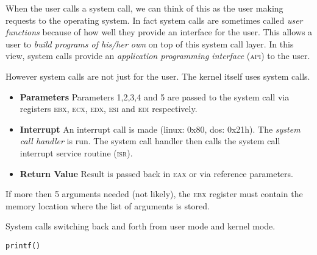
When the user calls a system call, we can think of this as the user making 
requests to the operating system. In fact system calls are sometimes called
\textit{user functions} because of how well they provide an interface for the user. 
This allows a user to \textit{build programs of his/her own} on top of this system call layer. 
In this view, system calls provide an \textit{application programming interface} 
(\textsc{api}) 
to the user.


However system calls are not just for the user. The kernel itself 
uses system calls. 

\frmrule



\begin{itemize}   
\renewcommand{\labelitemi}{$\Box$}
\item \textbf{Parameters} Parameters 1,2,3,4 and 5 are passed to the system call 
via registers \textsc{ebx}, \textsc{ecx}, \textsc{edx}, \textsc{esi} and \textsc{edi}
respectively. 
\item \textbf{Interrupt} An interrupt call is made (linux: 0x80, dos: 0x21h). 
The \textit{system call handler} is run. The system call handler 
then calls the system call interrupt service routine (\textsc{isr}).
\item \textbf{Return Value} Result is passed back in \textsc{eax} or via reference 
parameters. 
\end{itemize}


If more then 5 arguments needed (not likely), the \textsc{ebx}
register must contain the memory location where the list of arguments is stored.





System calls switching back and forth from user mode and kernel mode. 


\begin{example}

\begin{lstlisting}
printf()
\end{lstlisting}
\end{example}

\frmrule

